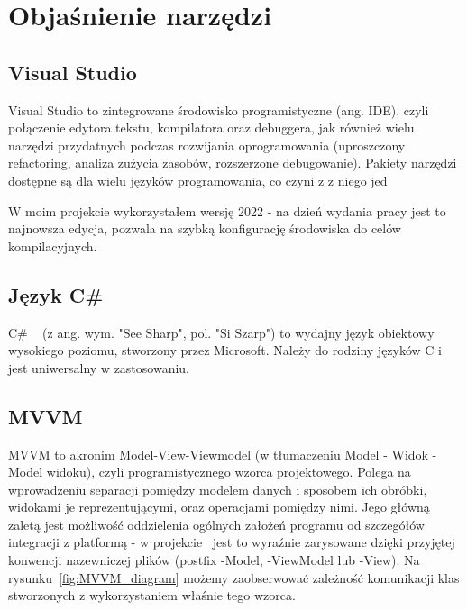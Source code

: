 \section{Objaśnienie narzędzi}

\subsection{Visual Studio}

Visual Studio \cite{visualStudio} to zintegrowane środowisko programistyczne (ang. IDE), 
czyli połączenie edytora tekstu, kompilatora oraz debuggera, jak również wielu narzędzi przydatnych podczas rozwijania oprogramowania
(uproszczony refactoring, analiza zużycia zasobów, rozszerzone debugowanie). Pakiety narzędzi dostępne są dla wielu
języków programowania, co czyni z z niego jed

W moim projekcie wykorzystałem wersję 2022 - na dzień wydania pracy jest to najnowsza edycja,
pozwala na szybką konfigurację środowiska do celów kompilacyjnych.


\subsection{Język C\#}

C\# ~\cite{csharpDocs} (z ang. wym. "See Sharp", pol. "Si Szarp") to wydajny język obiektowy wysokiego poziomu, 
stworzony przez Microsoft.
Należy do rodziny języków C i jest uniwersalny w zastosowaniu.

\subsection{MVVM}
MVVM to akronim Model-View-Viewmodel (w tłumaczeniu Model - Widok - Model widoku), czyli programistycznego wzorca projektowego.
Polega na wprowadzeniu separacji pomiędzy modelem danych i sposobem ich obróbki, widokami je reprezentującymi, oraz operacjami pomiędzy nimi. 
Jego główną zaletą jest możliwość oddzielenia ogólnych założeń programu od szczegółów integracji z platformą 
- w projekcie~\cite{Halaczkiewicz_SMCEBI_Navigator_GitHub} jest to wyraźnie zarysowane dzięki przyjętej 
konwencji nazewniczej plików (postfix -Model, -ViewModel lub -View).
Na rysunku~\ref{fig:MVVM_diagram} możemy zaobserwować zależność komunikacji klas stworzonych z wykorzystaniem właśnie tego wzorca.

